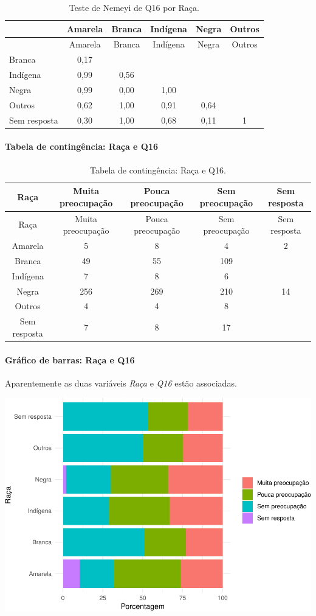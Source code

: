 \documentclass[]{article}
\let\oldparagraph\paragraph
\renewcommand{\paragraph}[1]{\oldparagraph{#1}\mbox{}}
\begin{document}
\begin{longtable}[]{@{}lccccc@{}}
\caption{\label{tab:unnamed-chunk-163}Teste de Nemeyi de Q16 por Raça.}\tabularnewline
\toprule
& Amarela & Branca & Indígena & Negra & Outros\tabularnewline
\midrule
\endfirsthead
\toprule
& Amarela & Branca & Indígena & Negra & Outros\tabularnewline
\midrule
\endhead
Branca & 0,17 & & & &\tabularnewline
Indígena & 0,99 & 0,56 & & &\tabularnewline
Negra & 0,99 & 0,00 & 1,00 & &\tabularnewline
Outros & 0,62 & 1,00 & 0,91 & 0,64 &\tabularnewline
Sem resposta & 0,30 & 1,00 & 0,68 & 0,11 & 1\tabularnewline
\bottomrule
\end{longtable}

\cleardoublepage

\hypertarget{tabela-de-continguxeancia-rauxe7a-e-q16-1}{%
\paragraph{Tabela de contingência: Raça e Q16}\label{tabela-de-continguxeancia-rauxe7a-e-q16-1}}

\begin{longtable}[]{@{}ccccc@{}}
\caption{\label{tab:unnamed-chunk-164}Tabela de contingência: Raça e Q16.}\tabularnewline
\toprule
Raça & Muita preocupação & Pouca preocupação & Sem preocupação & Sem resposta\tabularnewline
\midrule
\endfirsthead
\toprule
Raça & Muita preocupação & Pouca preocupação & Sem preocupação & Sem resposta\tabularnewline
\midrule
\endhead
Amarela & 5 & 8 & 4 & 2\tabularnewline
Branca & 49 & 55 & 109 &\tabularnewline
Indígena & 7 & 8 & 6 &\tabularnewline
Negra & 256 & 269 & 210 & 14\tabularnewline
Outros & 4 & 4 & 8 &\tabularnewline
Sem resposta & 7 & 8 & 17 &\tabularnewline
\bottomrule
\end{longtable}

\hypertarget{gruxe1fico-de-barras-rauxe7a-e-q16-1}{%
\paragraph{Gráfico de barras: Raça e Q16}\label{gruxe1fico-de-barras-rauxe7a-e-q16-1}}

Aparentemente as duas variáveis \emph{Raça} e \emph{Q16} estão associadas.

\begin{center}\includegraphics[width=0.75\linewidth]{relatorio_files/figure-latex/unnamed-chunk-165-1} \end{center}
\end{document}
